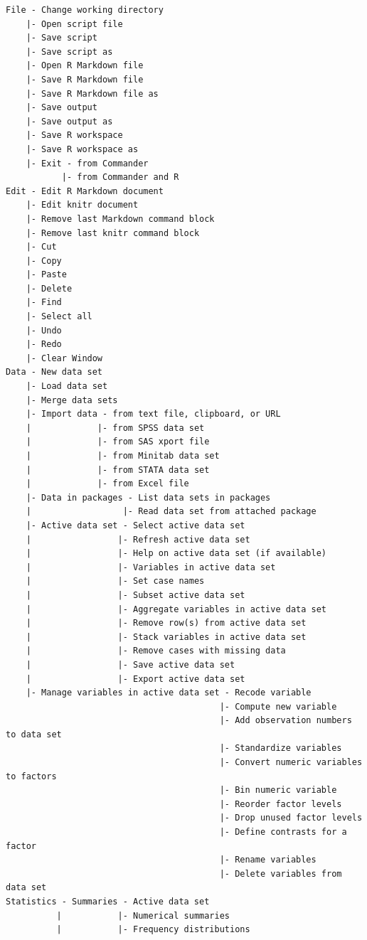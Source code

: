 \documentclass{article}%
\begin{document}
\begin{verbatim}
File - Change working directory
    |- Open script file
    |- Save script
    |- Save script as
    |- Open R Markdown file
    |- Save R Markdown file
    |- Save R Markdown file as
    |- Save output
    |- Save output as
    |- Save R workspace
    |- Save R workspace as
    |- Exit - from Commander
           |- from Commander and R
Edit - Edit R Markdown document
    |- Edit knitr document
    |- Remove last Markdown command block
    |- Remove last knitr command block
    |- Cut
    |- Copy
    |- Paste
    |- Delete
    |- Find
    |- Select all
    |- Undo
    |- Redo
    |- Clear Window
Data - New data set
    |- Load data set
    |- Merge data sets
    |- Import data - from text file, clipboard, or URL
    |             |- from SPSS data set
    |             |- from SAS xport file
    |             |- from Minitab data set
    |             |- from STATA data set
    |             |- from Excel file
    |- Data in packages - List data sets in packages
    |                  |- Read data set from attached package
    |- Active data set - Select active data set
    |                 |- Refresh active data set
    |                 |- Help on active data set (if available)
    |                 |- Variables in active data set
    |                 |- Set case names
    |                 |- Subset active data set
    |                 |- Aggregate variables in active data set
    |                 |- Remove row(s) from active data set
    |                 |- Stack variables in active data set
    |                 |- Remove cases with missing data
    |                 |- Save active data set
    |                 |- Export active data set
    |- Manage variables in active data set - Recode variable
                                          |- Compute new variable
                                          |- Add observation numbers to data set
                                          |- Standardize variables
                                          |- Convert numeric variables to factors
                                          |- Bin numeric variable
                                          |- Reorder factor levels
                                          |- Drop unused factor levels
                                          |- Define contrasts for a factor
                                          |- Rename variables
                                          |- Delete variables from data set
Statistics - Summaries - Active data set
          |           |- Numerical summaries
          |           |- Frequency distributions

\end{verbatim}
\end{document}
